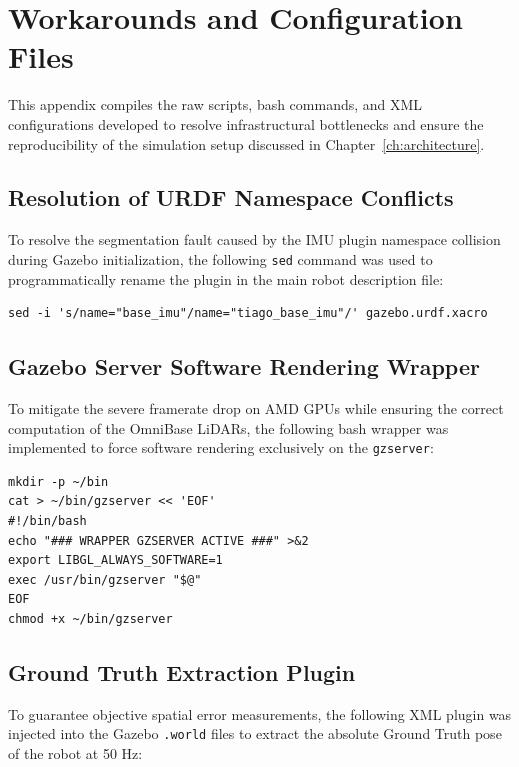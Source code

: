 \chapter{Workarounds and Configuration Files}
\label{app:troubleshooting}

This appendix compiles the raw scripts, bash commands, and XML configurations developed to resolve infrastructural bottlenecks and ensure the reproducibility of the simulation setup discussed in Chapter~\ref{ch:architecture}.

\section{Resolution of URDF Namespace Conflicts}
To resolve the segmentation fault caused by the IMU plugin namespace collision during Gazebo initialization, the following \texttt{sed} command was used to programmatically rename the plugin in the main robot description file:
\label{app:urdf_conflict}
\vspace{0.3cm}

\begin{lstlisting}[style=mybash]
sed -i 's/name="base_imu"/name="tiago_base_imu"/' gazebo.urdf.xacro
\end{lstlisting}


\section{Gazebo Server Software Rendering Wrapper}
To mitigate the severe framerate drop on AMD GPUs while ensuring the correct computation of the OmniBase LiDARs, the following bash wrapper was implemented to force software rendering exclusively on the \texttt{gzserver}:
\label{app:gzserver_wrapper}
\vspace{0.3cm}

\begin{lstlisting}[style=mybash]
mkdir -p ~/bin
cat > ~/bin/gzserver << 'EOF'
#!/bin/bash
echo "### WRAPPER GZSERVER ACTIVE ###" >&2
export LIBGL_ALWAYS_SOFTWARE=1
exec /usr/bin/gzserver "$@"
EOF
chmod +x ~/bin/gzserver
\end{lstlisting}


\section{Ground Truth Extraction Plugin}
To guarantee objective spatial error measurements, the following XML plugin was injected into the Gazebo \texttt{.world} files to extract the absolute Ground Truth pose of the robot at 50 Hz:
\label{app:gt_plugin}
\vspace{0.3cm}

